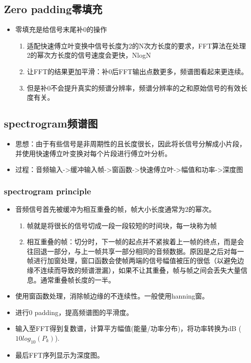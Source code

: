 \documentclass[UTF8]{ctexart}
\begin{document}
\subsection{Zero padding零填充}
\begin{itemize}
    \item 零填充是给信号末尾补0的操作
    \begin{enumerate}
        \item 适配快速傅立叶变换中信号长度为2的N次方长度的要求，FFT算法在处理2的幂次方长度的信号速度会更快，NlogN
        \item 让FFT的结果更加平滑：补0后FFT输出点数更多，频谱图看起来更连续。
        \item 但是补0不会提升真实的频谱分辨率，频谱分辨率的之和原始信号的有效长度有关。
    \end{enumerate}
\end{itemize}

\subsection{spectrogram频谱图}
\begin{itemize}
    \item 思想：由于有些信号是非周期性的且长度很长，因此将长信号分解成小片段，并使用快速傅立叶变换对每个片段进行傅立叶分析。
    \item 过程：音频输入->缓冲输入帧->窗函数->快速傅立叶->幅值和功率->深度图
\end{itemize}

\subsubsection{spectrogram principle}

\begin{itemize}
    \item 音频信号首先被缓冲为相互重叠的帧，帧大小长度通常为2的幂次。
    \begin{enumerate}
        \item 帧就是将很长的信号切成一段一段较短的时间块，每一块称为帧
        \item 相互重叠的帧：切分时，下一帧的起点并不紧挨着上一帧的终点，而是会往回退一部分，与上一帧共享一部分相同的音频数据。原因是之后对每一帧进行加窗处理，窗口函数会使帧两端的信号幅值被压的很低（以避免边缘不连续而导致的频谱泄漏），如果不让其重叠，帧与帧之间会丢失大量信息。通常重叠帧长度的一半。
    \end{enumerate}
    \item 使用窗函数处理，消除帧边缘的不连续性。一般使用hanning窗。
    \item 进行0 padding，提高频谱图的平滑度。
    \item 输入至FFT得到复数谱，计算平方幅值(能量/功率分布)，将功率转换为dB ($10log_{10}(P_k)$).
    \item 最后FFT序列显示为深度图。
\end{itemize}
\end{document}
